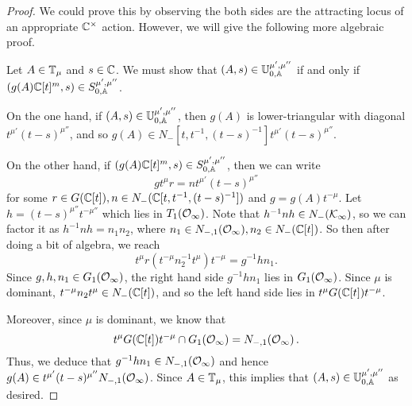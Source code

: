 \documentclass[draft]{article} %
\begin{document}
% 
% 
% 
% 
\begin{proof}
We could prove this by observing the both sides are the attracting locus of an appropriate $ {\mathbb C^\times}$ action. However, we will give the following more algebraic proof.

Let $ A \in \mathbb T_\mu$ and $ s \in \mathbb C $. We must show that  $ (A,s) \in \mathbb U^{\mu', \mu''}_{0,\mathbb A} $ if and only if $ (g(A)\mathbb C[t]^m,s) \in S^{\mu', \mu''}_{0,\mathbb A} $. 

On the one hand, if $ (A,s) \in \mathbb U^{\mu', \mu''}_{0,\mathbb A} $, then $ g(A)$ is lower-triangular with diagonal $ t^{\mu'} (t-s)^{\mu''}$, and so $ g(A) \in N_-[t, t^{-1}, (t-s)^{-1}] t^{\mu'} (t-s)^{\mu''}$. 

On the other hand, if $ (g(A)\mathbb C[t]^m, s) \in S^{\mu', \mu''}_{0,\mathbb A}$, then we can write 
$$
    g t^\mu r= n t^{\mu'} (t-s)^{\mu''}
$$
for some $ r \in G(\mathbb C[t]), n \in N_-(\mathbb C[t, t^{-1}, (t-s)^{-1}]) $ and $ g = g(A)t^{-\mu}$.  Let $ h = (t-s)^{\mu''} t^{-\mu''}$ which lies in $ T_1(\mathcal O_\infty) $. %
Note that $ h^{-1}n h \in N_-(\mathcal K_\infty)$, 
so we can factor it as $ h^{-1} n h  = n_1 n_2 $, where $ n_1 \in N_{-,1}(\mathcal O_\infty), n_2 \in N_-(\mathbb C[t])$.  So then after doing a bit of algebra, we reach
$$
    t^\mu r (t^{-\mu} n_2^{-1} t^\mu) t^{-\mu} = g^{-1} h n_1.
$$
Since $ g, h, n_1 \in G_1(\mathcal O_\infty)$, the right hand side $ g^{-1} h n_1 $ lies in $ G_1(\mathcal O_\infty) $.  Since $ \mu $ is dominant, $ t^{-\mu} n_2 t^\mu \in N_-(\mathbb C[t])$, and so the left hand side lies in $t^\mu G(\mathbb C[t]) t^{-\mu}$.

Moreover, since $ \mu $ is dominant, we know that 
$$
    t^\mu G(\mathbb C[t]) t^{-\mu} \cap G_1(\mathcal O_\infty) = N_{-,1}(\mathcal O_\infty)\,.
$$
Thus, we deduce that $ g^{-1} h n_1 \in N_{-,1}(\mathcal O_\infty)$ 
and hence $ g(A) \in t^{\mu'} (t-s)^{\mu''}N_{-,1}(\mathcal O_\infty) $.  
Since $ A \in \mathbb T_\mu $, this implies that $ (A,s) \in \mathbb U^{\mu', \mu''}_{0,\mathbb A}$ as desired.
\end{proof}
% 
\end{document}
